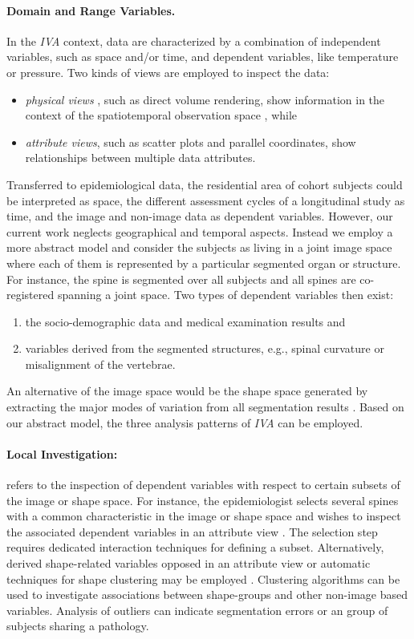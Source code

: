 \documentclass[journal]{style/vgtc} 			          %
\begin{document}
\paragraph{Domain and Range Variables. }
In the \emph{IVA} context, data are characterized by a combination of independent variables, such as space and/or time, and dependent variables, like temperature or pressure.
%
Two kinds of views are employed to inspect the data:
\begin{itemize} 
	\item \emph{physical views} \cite{Oeltze2013}, such as direct volume rendering, show information in the context of the spatiotemporal observation space \cite{Oeltze2007}, while
	\item \emph{attribute views}, such as scatter plots and parallel coordinates, show relationships between multiple data attributes.
\end{itemize}
Transferred to epidemiological data, the residential area of cohort subjects could be interpreted as space, the different assessment cycles of a longitudinal study as time, and the image and non-image data as dependent variables.
%
However, our current work neglects geographical and temporal aspects.
%
Instead we employ a more abstract model and consider the subjects as living in a joint image space where each of them is represented by a particular segmented organ or structure.
%
For instance, the spine is segmented over all subjects and all spines are co-registered spanning a joint space.
%
Two types of dependent variables then exist: 
\begin{enumerate}
	\item the socio-demographic data and medical examination results and 
	\item variables derived from the segmented structures, e.g., spinal curvature or misalignment of the vertebrae.
\end{enumerate}
An alternative of the image space would be the shape space generated by extracting the major modes of variation from all segmentation results \cite{Busking2010a}.
%
Based on our abstract model, the three analysis patterns of \emph{IVA} can be employed.

\paragraph{Local Investigation:} refers to the inspection of dependent variables with respect to certain subsets of the image or shape space.
%
For instance, the epidemiologist selects several spines with a common characteristic in the image or shape space and wishes to inspect the associated dependent variables in an attribute view \cite{Hermann2014}.
%
The selection step requires dedicated interaction techniques for defining a subset.
%
Alternatively, derived shape-related variables opposed in an attribute view or automatic techniques for shape clustering may be employed \cite{Klemm2013VMV}.
%
Clustering algorithms can be used to investigate associations between shape-groups and other non-image based variables.
%
Analysis of outliers can indicate segmentation errors or an group of subjects sharing a pathology.
\end{document}
